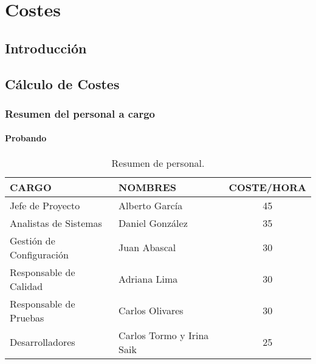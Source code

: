\documentclass[10pt,a4paper,oldfontcommands]{dpds}
\begin{document}
\pagecolor{fondo}
\color{principal}

\chapter{Costes}
\clearpage

\section{Introducción}


\section{Cálculo de Costes}
\subsection{Resumen del personal a cargo}

\subsubsection{Probando}


\begin{table}[H]
\begin{center}
\begin{tabular}{l l c}
\hline
\textbf{CARGO} & \textbf{NOMBRES} & \textbf{COSTE/HORA}\\ \hline
Jefe de Proyecto & Alberto García & 45  \\
Analistas de Sistemas & Daniel González & 35\\
Gestión de Configuración & Juan Abascal & 30\\
Responsable de Calidad & Adriana Lima & 30\\
Responsable de Pruebas & Carlos Olivares & 30\\
Desarrolladores & Carlos Tormo y  Irina Saik & 25\\
\end{tabular}
\caption{Resumen de personal.}
\label{tab:personal}
\end{center}
\end{table}
\end{document}
